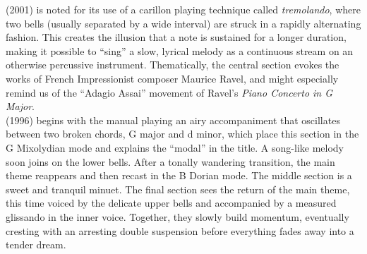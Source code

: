 \documentclass[11pt, letterpaper]{article}
\begin{document}
\begin{small}
    \divider

     (2001) is noted for its use of a carillon playing technique called \emph{tremolando}, where two bells (usually separated by a wide interval) are struck in a rapidly alternating fashion. This creates the illusion that a note is sustained for a longer duration, making it possible to ``sing'' a slow, lyrical melody as a continuous stream on an otherwise percussive instrument. Thematically, the central section evokes the works of French Impressionist composer Maurice Ravel, and might especially remind us of the ``Adagio Assai'' movement of Ravel’s \emph{Piano Concerto in G Major}.\\[.2em]
     (1996) begins with the manual playing an airy accompaniment that oscillates between two broken chords, G major and d minor, which place this section in the G Mixolydian mode and  explains the ``modal'' in the title. A song-like melody soon joins on the lower bells. After a tonally wandering transition, the main theme reappears and then recast in the B Dorian mode. The middle section is a sweet and tranquil minuet. The final section sees the return of the main theme, this time voiced by the delicate upper bells and accompanied by a measured glissando in the inner voice. Together, they slowly build momentum, eventually cresting with an arresting double suspension before everything fades away into a tender dream.

\end{small}

\vfill
\end{document}
